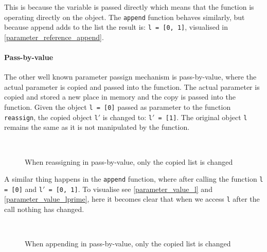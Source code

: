 
This is because the variable is passed directly which means that the function is operating directly on the object.
The \texttt{append} function behaves similarly, but because append adds to the list the result is: \texttt{l = [0, 1]}, visualised in \cref{parameter_reference_append}.



\paragraph{Pass-by-value}
The other well known parameter passign mechanism is pass-by-value, where the actual parameter is copied and passed into the function.
The actual parameter is copied and stored a new place in memory and the copy is passed into the function.
Given the object \texttt{l = [0]} passed as parameter to the function \texttt{reassign}, the copied object \texttt{l$'$} is changed to: \texttt{l$'$ = [1]}.
The original object \texttt{l}  remains the same as it is not manipulated by the function.

\begin{figure}[H]
  ~
  \caption{When reassigning in pass-by-value, only the copied list is changed}
\end{figure}

A similar thing happens in the \texttt{append} function, where after calling the function \texttt{l = [0]} and \texttt{l$'$ = [0, 1]}.
To visualise see \cref{parameter_value_l} and \cref{parameter_value_lprime}, here it becomes clear that when we access \texttt{l} after the call nothing has changed.

\begin{figure}[H]
  ~
  \caption{When appending in pass-by-value, only the copied list is changed}
\end{figure}

